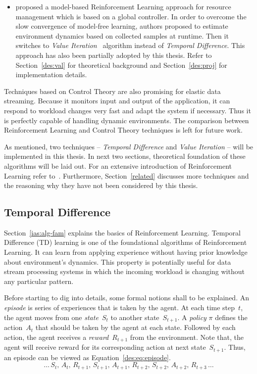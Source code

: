 \begin{description}[leftmargin=0pt]
\begin{itemize}
        \item \textcite{dutreilh:hal-01122123} proposed a model-based Reinforcement Learning approach for resource management which is based on a global controller. In order to overcome the slow convergence of model-free learning, authors proposed to estimate environment dynamics based on collected samples at runtime. Then it switches to \emph{Value Iteration}~\cite{rlIntro} algorithm instead of \emph{Temporal Difference}. This approach has also been partially adopted by this thesis. Refer to Section~\ref{des:val} for theoretical background and Section~\ref{des:proj} for implementation details.
    \end{itemize}
    \item[Control Theory] Techniques based on Control Theory are also promising for elastic data streaming. Because it monitors input and output of the application, it can respond to workload changes very fast and adapt the system if necessary. Thus it is perfectly capable of handling dynamic environments. The comparison between Reinforcement Learning and Control Theory techniques is left for future work.
\end{description}
As mentioned, two techniques -- \emph{Temporal Difference} and \emph{Value Iteration} -- will be implemented in this thesis. In next two sections, theoretical foundation of these algorithms will be laid out. For an extensive introduction of Reinforcement Learning refer to~\textcite{rlIntro}. Furthermore, Section~\ref{related} discusses more techniques and the reasoning why they have not been considered by this thesis.
\subsection{Temporal Difference}
\label{des:temp}
Section~\ref{ias:alg-fam} explains the basics of Reinforcement Learning. Temporal Difference (TD) learning is one of the foundational algorithms of Reinforcement Learning. It can learn from applying experience without having prior knowledge about environment's dynamics. This property is potentially useful for data stream processing systems in which the incoming workload is changing without any particular pattern.

Before starting to dig into details, some formal notions shall to be explained. An \emph{episode} is series of experiences that is taken by the agent. At each time step~$t$, the agent moves from one \emph{state}~$S_t$ to another state~$S_{t+1}$. A \emph{policy} $\pi$ defines the action~$A_t$ that should be taken by the agent at each state. Followed by each action, the agent receives a \emph{reward}~$R_{t+1}$ from the environment. Note that, the agent will receive reward for its corresponding action at next state~$S_{t+1}$. Thus, an episode can be viewed as Equation~\ref{des:eq:episode}.
\begin{equation}
\dots\,S_t,\,A_t,\,R_{t+1},\,S_{t+1},\,A_{t+1},\,R_{t+2},\,S_{t+2},\,A_{t+2},\,R_{t+3}\,\dots
\label{des:eq:episode}
\end{equation}

